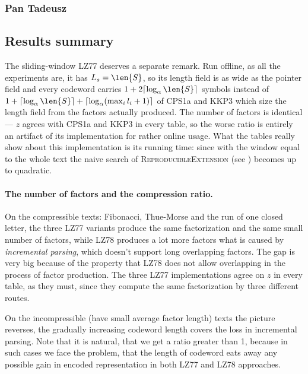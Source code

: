 \subsubsection{Pan Tadeusz}
{
\setlength{\floatsep}{6pt plus 2pt minus 2pt}
\setlength{\textfloatsep}{6pt plus 2pt minus 2pt}
\setlength{\intextsep}{6pt plus 2pt minus 2pt}
\setlength{\abovecaptionskip}{4pt}
\setlength{\belowcaptionskip}{0pt}


}

\subsection{Results summary}

The sliding-window LZ77 deserves a separate remark. Run offline, as all the experiments are, it has \(L_s = \len{S}\), so its length field is as wide as the pointer field and every codeword carries \(1 + 2\ceil{\log_\alpha\len{S}}\) symbols instead of \(1 + \ceil{\log_\alpha \len{S}} + \ceil{\log_\alpha (\max_i l_i + 1)}\) of CPS1a and KKP3 which size the length field from the factors actually produced. The number of factors is identical --- \(z\) agrees with CPS1a and KKP3 in every table, so the worse ratio is entirely an artifact of its implementation for rather online usage. What the tables really show about this implementation is its running time: since with the window equal to the whole text the naive search of \textsc{ReproducibleExtension} (see ) becomes up to quadratic.

\paragraph{The number of factors and the compression ratio.}
On the compressible texts: Fibonacci, Thue-Morse and the run of one closed letter, the three LZ77 variants produce the same factorization and the same small number of factors, while LZ78 produces a lot more factors what is caused by \emph{incremental parsing}, which doesn't support long overlapping factors. The gap is very big because of the property that LZ78 does not allow overlapping in the process of factor production. The three LZ77 implementations agree on \(z\) in every table, as they must, since they compute the same factorization by three different routes.

On the incompressible (have small average factor length) texts the picture reverses, the gradually increasing codeword length covers the loss in incremental parsing. Note that it is natural, that we get a ratio greater than 1, because in such cases we face the problem, that the length of codeword eats away any possible gain in encoded representation in both LZ77 and LZ78 approaches. 

